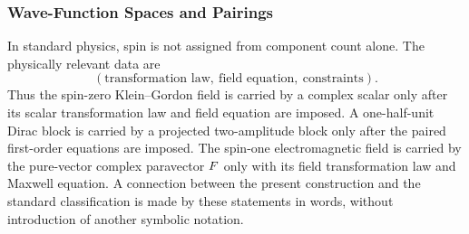 \subsubsection{Wave-Function Spaces and Pairings}
In standard physics, spin is not assigned from component count alone. The physically relevant data are
\begin{equation*}
(\text{transformation law},\ \text{field equation},\ \text{constraints}).
\end{equation*}
Thus the spin-zero Klein--Gordon field is carried by a complex scalar only
after its scalar transformation law and field equation are imposed. A
one-half-unit Dirac block is carried by a projected two-amplitude block only after
the paired first-order equations are imposed. The spin-one electromagnetic
field is carried by the pure-vector complex paravector \(F\) only with
its field transformation law and Maxwell equation. A connection between the present
construction and the standard classification is made by these statements in
words, without introduction of another symbolic notation.

